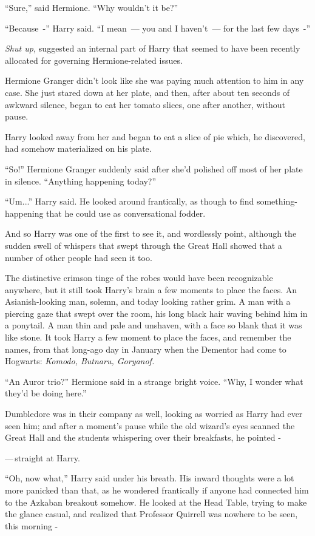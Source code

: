 ``Sure,'' said Hermione. ``Why wouldn't it be?''

``Because~-'' Harry said. ``I mean~--- you and I haven't~--- for the last few days~-''

\emph{Shut up,} suggested an internal part of Harry that seemed to have been recently allocated for governing Hermione-related issues.

Hermione Granger didn't look like she was paying much attention to him in any case. She just stared down at her plate, and then, after about ten seconds of awkward silence, began to eat her tomato slices, one after another, without pause.

Harry looked away from her and began to eat a slice of pie which, he discovered, had somehow materialized on his plate.

``So!'' Hermione Granger suddenly said after she'd polished off most of her plate in silence. ``Anything happening today?''

``Um...'' Harry said. He looked around frantically, as though to find something-happening that he could use as conversational fodder.

And so Harry was one of the first to see it, and wordlessly point, although the sudden swell of whispers that swept through the Great Hall showed that a number of other people had seen it too.

The distinctive crimson tinge of the robes would have been recognizable anywhere, but it still took Harry's brain a few moments to place the faces. An Asianish-looking man, solemn, and today looking rather grim. A man with a piercing gaze that swept over the room, his long black hair waving behind him in a ponytail. A man thin and pale and unshaven, with a face so blank that it was like stone. It took Harry a few moment to place the faces, and remember the names, from that long-ago day in January when the Dementor had come to Hogwarts: \emph{Komodo, Butnaru, Goryanof.}

``An Auror trio?'' Hermione said in a strange bright voice. ``Why, I wonder what they'd be doing here.''

Dumbledore was in their company as well, looking as worried as Harry had ever seen him; and after a moment's pause while the old wizard's eyes scanned the Great Hall and the students whispering over their breakfasts, he pointed -

---\,straight at Harry.

``Oh, now what,'' Harry said under his breath. His inward thoughts were a lot more panicked than that, as he wondered frantically if anyone had connected him to the Azkaban breakout somehow. He looked at the Head Table, trying to make the glance casual, and realized that Professor Quirrell was nowhere to be seen, this morning -

